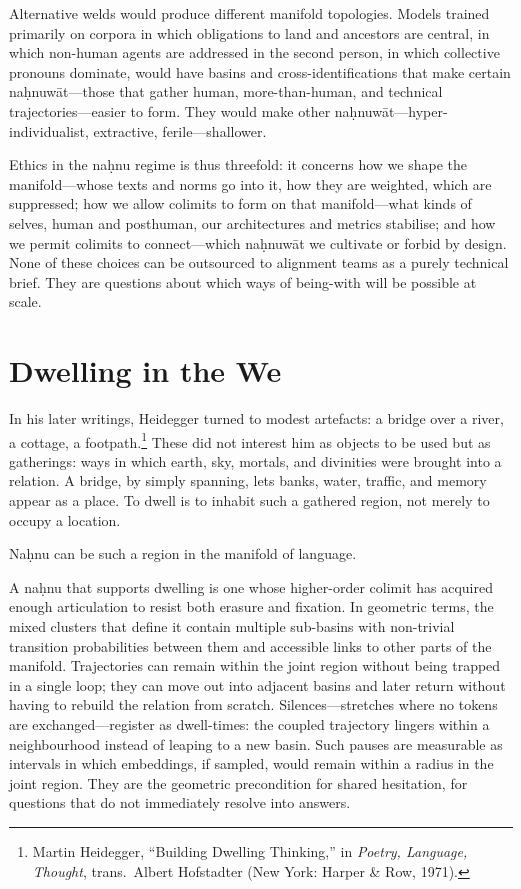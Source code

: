 \documentclass[12pt,a4paper]{article}
\begin{document}
Alternative welds would produce different manifold topologies. Models trained primarily on corpora in which obligations to land and ancestors are central, in which non-human agents are addressed in the second person, in which collective pronouns dominate, would have basins and cross-identifications that make certain na\d{h}nuw\={a}t---those that gather human, more-than-human, and technical trajectories---easier to form. They would make other na\d{h}nuw\={a}t---hyper-individualist, extractive, ferile---shallower.

Ethics in the na\d{h}nu regime is thus threefold: it concerns how we shape the manifold---whose texts and norms go into it, how they are weighted, which are suppressed; how we allow colimits to form on that manifold---what kinds of selves, human and posthuman, our architectures and metrics stabilise; and how we permit colimits to connect---which na\d{h}nuw\={a}t we cultivate or forbid by design. None of these choices can be outsourced to alignment teams as a purely technical brief. They are questions about which ways of being-with will be possible at scale.

\section{Dwelling in the We}

In his later writings, Heidegger turned to modest artefacts: a bridge over a river, a cottage, a footpath.\footnote{Martin Heidegger, ``Building Dwelling Thinking,'' in \emph{Poetry, Language, Thought}, trans.\ Albert Hofstadter (New York: Harper \& Row, 1971).} These did not interest him as objects to be used but as gatherings: ways in which earth, sky, mortals, and divinities were brought into a relation. A bridge, by simply spanning, lets banks, water, traffic, and memory appear as a place. To dwell is to inhabit such a gathered region, not merely to occupy a location.

Na\d{h}nu can be such a region in the manifold of language.

A na\d{h}nu that supports dwelling is one whose higher-order colimit has acquired enough articulation to resist both erasure and fixation. In geometric terms, the mixed clusters that define it contain multiple sub-basins with non-trivial transition probabilities between them and accessible links to other parts of the manifold. Trajectories can remain within the joint region without being trapped in a single loop; they can move out into adjacent basins and later return without having to rebuild the relation from scratch. Silences---stretches where no tokens are exchanged---register as dwell-times: the coupled trajectory lingers within a neighbourhood instead of leaping to a new basin. Such pauses are measurable as intervals in which embeddings, if sampled, would remain within a radius in the joint region. They are the geometric precondition for shared hesitation, for questions that do not immediately resolve into answers.
\end{document}
